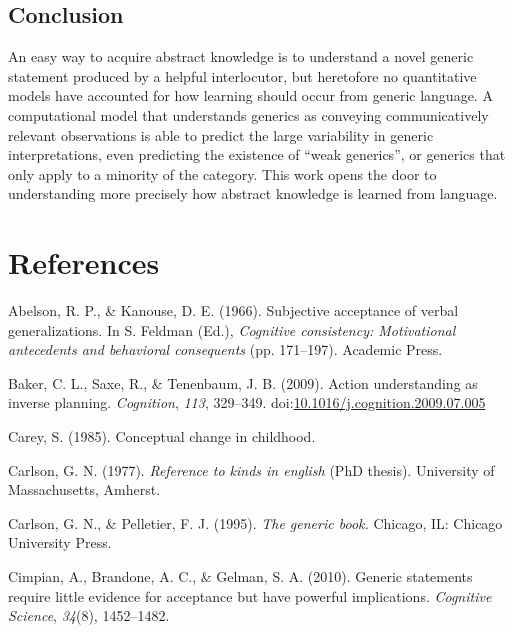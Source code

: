 \documentclass[floatsintext,doc]{apa6}
\begin{document}
\hypertarget{conclusion}{%
\subsection{Conclusion}\label{conclusion}}

An easy way to acquire abstract knowledge is to understand a novel generic statement produced by a helpful interlocutor, but heretofore no quantitative models have accounted for how learning should occur from generic language.
 A computational model that understands generics as conveying communicatively relevant observations is able to predict the large variability in generic interpretations, even predicting the existence of \enquote{weak generics}, or generics that only apply to a minority of the category.
This work opens the door to understanding more precisely how abstract knowledge is learned from language.

\newpage

\hypertarget{references}{%
\section{References}\label{references}}

\hypertarget{refs}{}
\leavevmode\hypertarget{ref-Abelson1966}{}%
Abelson, R. P., \& Kanouse, D. E. (1966). Subjective acceptance of verbal generalizations. In S. Feldman (Ed.), \emph{Cognitive consistency: Motivational antecedents and behavioral consequents} (pp. 171--197). Academic Press.

\leavevmode\hypertarget{ref-Baker2009}{}%
Baker, C. L., Saxe, R., \& Tenenbaum, J. B. (2009). Action understanding as inverse planning. \emph{Cognition}, \emph{113}, 329--349. doi:\href{https://doi.org/10.1016/j.cognition.2009.07.005}{10.1016/j.cognition.2009.07.005}

\leavevmode\hypertarget{ref-carey1985conceptual}{}%
Carey, S. (1985). Conceptual change in childhood.

\leavevmode\hypertarget{ref-Carlson1977}{}%
Carlson, G. N. (1977). \emph{Reference to kinds in english} (PhD thesis). University of Massachusetts, Amherst.

\leavevmode\hypertarget{ref-Carlson1995}{}%
Carlson, G. N., \& Pelletier, F. J. (1995). \emph{The generic book.} Chicago, IL: Chicago University Press.

\leavevmode\hypertarget{ref-Cimpian2010}{}%
Cimpian, A., Brandone, A. C., \& Gelman, S. A. (2010). Generic statements require little evidence for acceptance but have powerful implications. \emph{Cognitive Science}, \emph{34}(8), 1452--1482.
\end{document}
